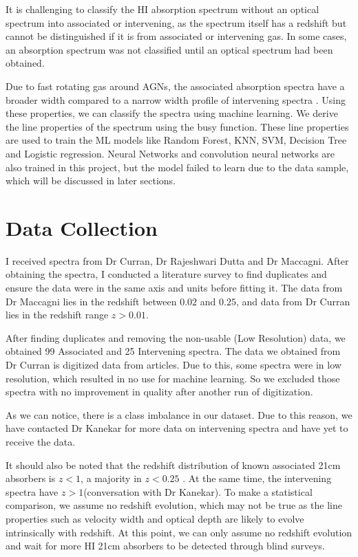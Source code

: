 \documentclass[10pt,twocolumn,letterpaper]{article}
\begin{document}
It is challenging to classify the HI absorption spectrum without an optical spectrum into associated or intervening, as the spectrum itself has a redshift but cannot be distinguished if it is from associated or intervening gas. In some cases, an absorption spectrum was not classified until an optical spectrum had been obtained\cite{5}.

Due to fast rotating gas around AGNs, the associated absorption spectra have a broader width \cite{6} compared to a narrow width profile of intervening spectra \cite{7}. Using these properties, we can classify the spectra using machine learning. We derive the line properties of the spectrum using the busy function\cite{8}. These line properties are used to train the ML models like Random Forest, KNN, SVM, Decision Tree and Logistic regression. Neural Networks and convolution neural networks are also trained in this project, but the model failed to learn due to the data sample, which will be discussed in later sections.


\section{Data Collection}

I received spectra from Dr Curran\cite{9}, Dr Rajeshwari Dutta\cite{10, 11, 12} and Dr Maccagni\cite{13}. After obtaining the spectra, I conducted a literature survey to find duplicates and ensure the data were in the same axis and units before fitting it. The data from Dr Maccagni lies in the redshift between $0.02$ and $0.25$, and data from Dr Curran lies in the redshift range $z > 0.01$. 

After finding duplicates and removing the non-usable (Low Resolution) data, we obtained 99 Associated and 25 Intervening spectra. The data we obtained from Dr Curran is digitized data from articles. Due to this, some spectra were in low resolution, which resulted in no use for machine learning. So we excluded those spectra with no improvement in quality after another run of digitization.

As we can notice, there is a class imbalance in our dataset. Due to this reason, we have contacted Dr Kanekar for more data on intervening spectra and have yet to receive the data.


It should also be noted that the redshift distribution of known associated 21cm absorbers is $z < 1$, a majority in $z < 0.25$ \cite{13}. At the same time, the intervening spectra have $z > 1$(conversation with Dr Kanekar). To make a statistical comparison, we assume no redshift evolution, which may not be true as the line properties such as velocity width and optical depth are likely to evolve intrinsically with redshift. At this point, we can only assume no redshift evolution and wait for more HI 21cm absorbers to be detected through blind surveys.
\end{document}
